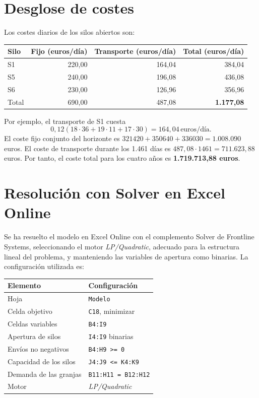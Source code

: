 \documentclass[11pt,a4paper]{article}
\newcommand{\eur}{\,\text{euros}}
\begin{document}
\section*{Desglose de costes}
Los costes diarios de los silos abiertos son:
\begin{center}\begin{tabular}{lrrr}\toprule
Silo & Fijo (euros/día) & Transporte (euros/día) & Total (euros/día) \\\midrule
S1 & 220,00 & 164,04 & 384,04 \\
S5 & 240,00 & 196,08 & 436,08 \\
S6 & 230,00 & 126,96 & 356,96 \\
\midrule
Total & 690,00 & 487,08 & \textbf{1.177,08} \\\bottomrule
\end{tabular}\end{center}
Por ejemplo, el transporte de S1 cuesta
\[
0{,}12(18\cdot36+19\cdot11+17\cdot30)=164{,}04\eur/\text{día}.
\]
El coste fijo conjunto del horizonte es
$321420+350640+336030=1.008.090$ euros. El coste de transporte durante los 1.461 días es
$487{,}08\cdot1461=711.623{,}88$ euros. Por tanto, el coste total para los cuatro años es
\textbf{1.719.713,88 euros}.

\section*{Resolución con Solver en Excel Online}
Se ha resuelto el modelo en Excel Online con el complemento Solver de Frontline Systems,
seleccionando el motor \emph{LP/Quadratic}, adecuado para la estructura lineal del problema,
y manteniendo las variables de apertura como binarias. La configuración utilizada es:

\begin{center}\small\begin{tabular}{ll}\toprule
Elemento & Configuración \\\midrule
Hoja & \texttt{Modelo} \\
Celda objetivo & \texttt{C18}, minimizar \\
Celdas variables & \texttt{B4:I9} \\
Apertura de silos & \texttt{I4:I9} binarias \\
Envíos no negativos & \texttt{B4:H9 >= 0} \\
Capacidad de los silos & \texttt{J4:J9 <= K4:K9} \\
Demanda de las granjas & \texttt{B11:H11 = B12:H12} \\
Motor & \emph{LP/Quadratic} \\
\bottomrule\end{tabular}\end{center}
\end{document}
